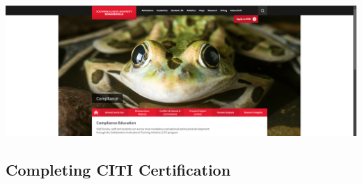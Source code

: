 \documentclass[
]{book}
\begin{document}
\href{https://www.siue.edu/compliance/training/}{\includegraphics[width=1\linewidth,height=\textheight,keepaspectratio]{images/compliance-education.png}}

\subsection*{Completing CITI Certification}\label{completing-citi-certification}
\end{document}
